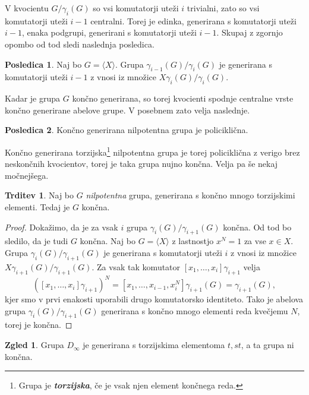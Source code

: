 \documentclass[11pt]{book}
\def\definicija{\color{rdeca}\bf\em}
\theoremstyle{definition}
\theoremstyle{zgled}
\newtheorem*{zgled}{Zgled}
\theoremstyle{odprtproblem}
\theoremstyle{domacanaloga}
\newenvironment{dokaz}
    {\color{siva}\begin{proof}}
    {\end{proof}}
\theoremstyle{izrek}
\newtheorem*{trditev}{Trditev}
\newtheorem*{posledica}{Posledica}
\begin{document}
V kvocientu $G/\gamma_i(G)$ so vsi komutatorji uteži $i$ trivialni, zato so vsi komutatorji uteži $i-1$ centralni. Torej je edinka, generirana s komutatorji uteži $i-1$, enaka podgrupi, generirani s komutatorji uteži $i-1$. Skupaj z zgornjo opombo od tod sledi naslednja posledica.

\begin{posledica}
Naj bo $G = \langle X \rangle$. Grupa $\gamma_{i-1}(G)/\gamma_i(G)$ je generirana s komutatorji uteži $i-1$ z vnosi iz množice $X \gamma_i(G)/\gamma_i(G)$.
\end{posledica}

Kadar je grupa $G$ končno generirana, so torej kvocienti spodnje centralne vrste končno generirane abelove grupe. V posebnem zato velja naslednje.

\begin{posledica}
Končno generirana nilpotentna grupa je policiklična.
\end{posledica}

Končno generirana torzijska\footnote{Grupa je {\definicija torzijska}, če je vsak njen element končnega reda.} nilpotentna grupa je torej policiklična z verigo brez neskončnih kvocientov, torej je taka grupa nujno končna. Velja pa še nekaj močnejšega.

\begin{trditev}
Naj bo $G$ {\em nilpotentna} grupa, generirana s končno mnogo torzijskimi elementi. Tedaj je $G$ končna.
\end{trditev}

\begin{dokaz}
Dokažimo, da je za vsak $i$ grupa $\gamma_i(G)/\gamma_{i+1}(G)$ končna. Od tod bo sledilo, da je tudi $G$ končna. Naj bo $G= \langle X \rangle$ z lastnostjo $x^N = 1$ za vse $x \in X$. Grupa $\gamma_i(G)/\gamma_{i+1}(G)$ je generirana s komutatorji uteži $i$ z vnosi iz množice $X \gamma_{i+1}(G)/\gamma_{i+1}(G)$. Za vsak tak komutator $[x_1, \dots, x_i] \gamma_{i+1}$ velja
\[
\left( [x_1, \dots, x_i] \gamma_{i+1} \right)^N = [x_1, \dots, x_{i-1}, x_i^N] \gamma_{i+1}(G) = \gamma_{i+1}(G),
\]
kjer smo v prvi enakosti uporabili drugo komutatorsko identiteto. Tako je abelova grupa $\gamma_i(G)/\gamma_{i+1}(G)$ generirana s končno mnogo elementi reda kvečjemu $N$, torej je končna.
\end{dokaz}

\begin{zgled}
Grupa $D_\infty$ je generirana s torzijskima elementoma $t, st$, a ta grupa ni končna.
\end{zgled}
\end{document}
